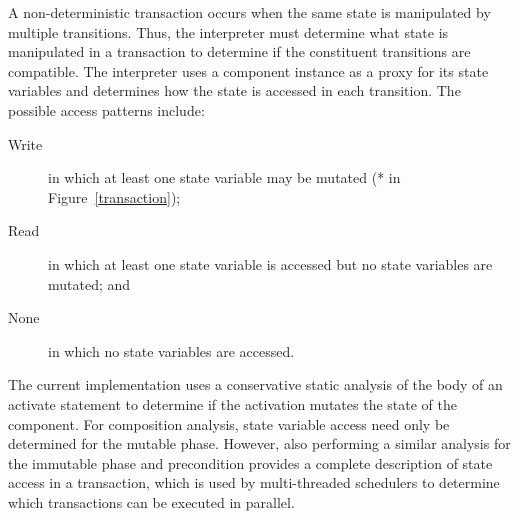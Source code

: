 A non-deterministic transaction occurs when the same state is manipulated by multiple transitions.
Thus, the interpreter must determine what state is manipulated in a transaction to determine if the constituent transitions are compatible.
The interpreter uses a component instance as a proxy for its state variables and determines how the state is accessed in each transition.
The possible access patterns include:
\begin{description}
  \item[Write] in which at least one state variable may be mutated (* in Figure~\ref{transaction});
  \item[Read] in which at least one state variable is accessed but no state variables are mutated; and
  \item[None] in which no state variables are accessed.
\end{description}
The current implementation uses a conservative static analysis of the body of an activate statement to determine if the activation mutates the state of the component.
For composition analysis, state variable access need only be determined for the mutable phase.
However, also performing a similar analysis for the immutable phase and precondition provides a complete description of state access in a transaction, which is used by multi-threaded schedulers to determine which transactions can be executed in parallel.

